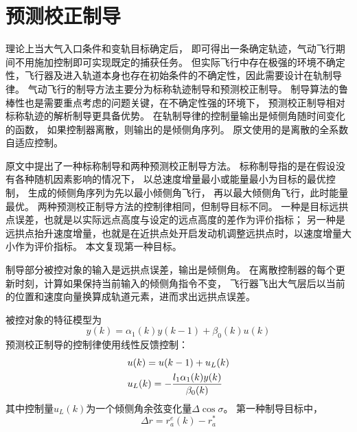 \section{预测校正制导}
理论上当大气入口条件和变轨目标确定后，
即可得出一条确定轨迹，气动飞行期间不用施加控制即可实现既定的捕获任务。
但实际飞行中存在极强的环境不确定性，飞行器及进入轨道本身也存在初始条件的不确定性，因此需要设计在轨制导律。
气动飞行的制导方法主要分为标称轨迹制导和预测校正制导。
制导算法的鲁棒性也是需要重点考虑的问题关键，在不确定性强的环境下，
预测校正制导相对标称轨迹的解析制导更具备优势\cite{dqingyuan2019}。
在轨制导律的控制量输出是倾侧角随时间变化的函数，
如果控制器离散，则输出的是倾侧角序列。
原文使用的是离散的全系数自适应控制。

原文中提出了一种标称制导和两种预测校正制导方法。
标称制导指的是在假设没有各种随机因素影响的情况下，
以总速度增量最小或能量最小为目标的最优控制，
生成的倾侧角序列为先以最小倾侧角飞行，
再以最大倾侧角飞行，此时能量最优。
两种预测校正制导方法的控制律相同，但制导目标不同。
一种是目标远拱点误差，也就是以实际远点高度与设定的远点高度的差作为评价指标；
另一种是远拱点抬升速度增量，也就是在近拱点处开启发动机调整远拱点时，以速度增量大小作为评价指标。
本文复现第一种目标。

制导部分被控对象的输入是远拱点误差，输出是倾侧角。
在离散控制器的每个更新时刻，计算如果保持当前输入的倾侧角指令不变，
飞行器飞出大气层后以当前的位置和速度向量换算成轨道元素，进而求出远拱点误差。

被控对象的特征模型为
\[ y(k) = \alpha_1(k)y(k-1) + \beta_0(k)u(k) \]
预测校正制导的控制律使用线性反馈控制：
\begin{align}
    &u(k) = u(k-1) + u_L(k) \notag\\
    &u_L(k) = -\frac{l_1\alpha_1(k)y(k)}{\beta_0(k)} \label{eqGuideCtrl}
\end{align}
其中控制量$u_L(k)$为一个倾侧角余弦变化量$\Delta\cos\sigma$。
第一种制导目标中，
\begin{equation*}
    \Delta r = r_a^e(k) - r_a^*
\end{equation*}

